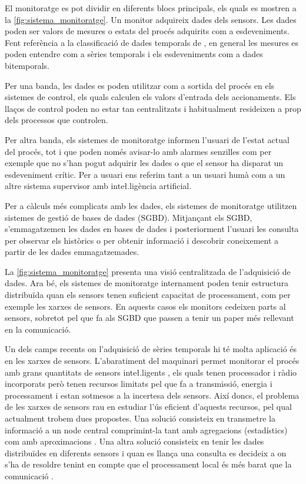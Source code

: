 El monitoratge es pot dividir en diferents blocs principals, els quals es mostren a la \autoref{fig:sistema_monitoratge}. Un monitor adquireix dades dels sensors. Les dades poden ser valors de mesures o estats del procés adquirits com a esdeveniments. Fent referència a la classificació de dades temporals de \textcite{assfalg08:thesis}, en general les mesures es poden entendre com a sèries temporals i els esdeveniments com a dades bitemporals.

Per una banda, les dades es poden utilitzar com a sortida del procés en els sistemes de control, els quals calculen els valors d'entrada dels accionaments.
Els llaços de control poden no estar tan centralitzats i habitualment resideixen a prop dels processos que controlen.

Per altra banda, els sistemes de monitoratge informen l'usuari de l'estat actual del procés, tot i que poden només avisar-lo amb alarmes senzilles com per exemple que no s'han pogut adquirir les dades o que el sensor ha disparat un esdeveniment crític. Per a usuari ens referim tant a un usuari humà com a un altre sistema supervisor amb inte\l.ligència artificial. 

Per a càlculs més complicats amb les dades, els sistemes de monitoratge utilitzen sistemes de gestió de bases de dades (SGBD). Mitjançant els SGBD, s'emmagatzemen les dades en bases de dades i posteriorment l'usuari les consulta per observar els històrics o per obtenir informació i descobrir coneixement a partir de les dades emmagatzemades. 

La \autoref{fig:sistema_monitoratge} presenta una visió centralitzada de l'adquisició de dades. Ara bé, els sistemes de monitoratge internament poden tenir estructura distribuïda quan els sensors tenen suficient capacitat de processament, com per exemple les xarxes de sensors. En aquests casos els monitors cedeixen parts al sensors, sobretot pel que fa als SGBD que passen a tenir un paper més rellevant en la comunicació.  


Un dels camps recents on l'adquisició de sèries temporals hi té molta aplicació és en les xarxes de sensors. L'abaratiment del maquinari permet monitorar el procés amb grans quantitats de sensors inte\l.ligents \parencite{jainagrawal05,yaogehrke02}, els quals tenen processador i ràdio incorporats però tenen recursos limitats pel que fa a transmissió, energia i processament i estan sotmesos a la incertesa dels sensors. Així doncs, el problema  de les xarxes de sensors rau en estudiar l'ús eficient d'aquests recursos, pel qual actualment trobem dues propostes.
Una solució consisteix en transmetre la informació a un node central comprimint-la tant amb agregacions (estadístics) com amb aproximacions \parencite{deligiannakis07}.
Una altra solució consisteix en tenir les dades distribuïdes en diferents sensors i quan es llança una consulta es decideix a on s'ha de resoldre tenint en compte que el processament local és més barat que la comunicació \parencite{yaogehrke02,gehrkemadden04,bonnet01}. 





